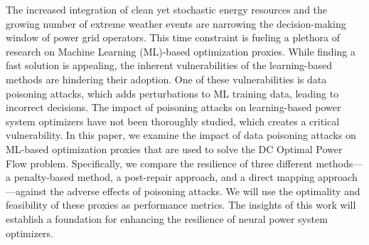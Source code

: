The increased integration of clean yet stochastic energy resources and the growing number of extreme weather events are narrowing the decision-making window of power grid operators. This time constraint is fueling a plethora of research on Machine Learning (ML)-based optimization proxies. While finding a fast solution is appealing, the inherent vulnerabilities of the learning-based methods are hindering their adoption. One of these vulnerabilities is data poisoning attacks, which adds perturbations to ML training data, leading to incorrect decisions. The impact of poisoning attacks on learning-based power system optimizers have not been thoroughly studied, which creates a critical vulnerability. In this paper, we examine the impact of data poisoning attacks on ML-based optimization proxies that are used to solve the DC Optimal Power Flow problem. Specifically, we compare the resilience of three different methods—a penalty-based method, a post-repair approach, and a direct mapping approach—against the adverse effects of poisoning attacks. We will use the optimality and feasibility of these proxies as performance metrics. The insights of this work will establish a foundation for enhancing the resilience of neural power system optimizers.
